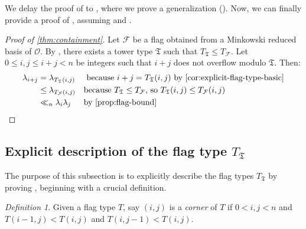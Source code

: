 \documentclass[letterpaper,10pt]{amsart}
\newcommand{\cO}{\mathcal{O}}      %
\newcommand{\mfT}{\mathfrak{T}}
\newcommand{\cF}{\mathcal{F}}
\theoremstyle{definition}
\theoremstyle{remark}
\newtheorem{definition}[theorem]{Definition}
\begin{document}
 We delay the proof of  to , where we prove a generalization (). Now, we can finally provide a proof of , assuming  and .

\begin{proof}[Proof of \cref{thm:containment}]
Let $\cF$ be a flag obtained from a Minkowski reduced basis of $\cO$. By , there exists a tower type $\mfT$ such that $T_{\mfT} \leq T_{\cF}$. Let $0 \leq i,j \leq i+j < n$ be integers such that $i+j$ does not overflow modulo $\mfT$. Then:
\begin{align*}
\lambda_{i+j} &=  \lambda_{T_{\mfT}(i,j)} && \text{ because $i+j = T_{\mfT}(i,j)$ by  \Cref{cor:explicit-flag-type-basic}} \\
&\leq \lambda_{T_{\cF}(i,j)} && \text{because $T_{\mfT} \leq T_{\cF}$, so $T_{\mfT}(i,j) \leq T_{\cF}(i,j)$}\\
&\ll_n \lambda_i \lambda_j && \text{by \Cref{prop:flag-bound}}
\end{align*}
\end{proof}

\subsection{Explicit description of the flag type $T_{\mfT}$}
\label{subsec:explicit-flag-type}

The purpose of this subsection is to explicitly describe the flag types $T_{\mfT}$ by proving , beginning with a crucial definition. 

\begin{definition}
\label{def:corner}
Given a flag type $T$, say $(i,j)$ is a \emph{corner} of $T$ if $0 < i,j < n$ and $T(i-1,j) < T(i,j)$ and $T(i,j-1) < T(i,j)$.
\end{definition}
\end{document}
